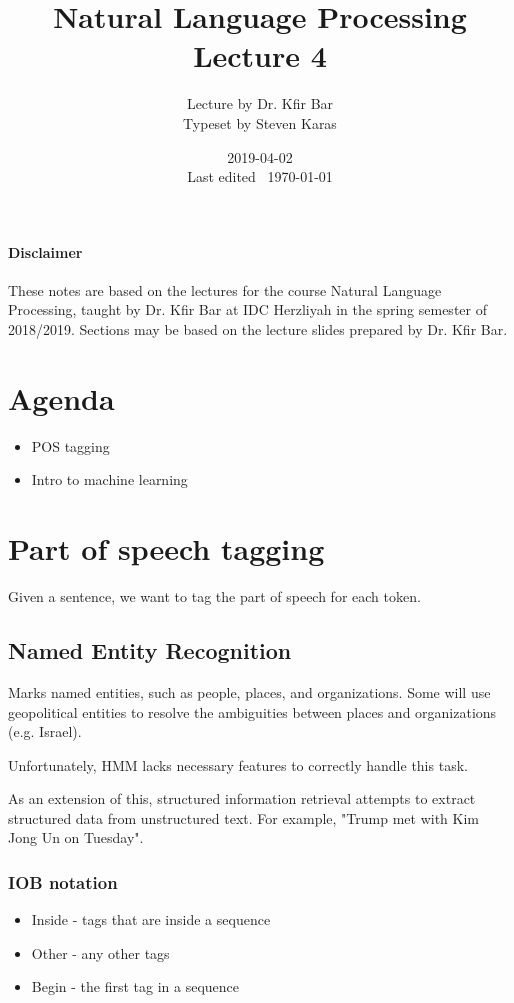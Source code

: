 \documentclass{idc_msc}
\title{Natural Language Processing \\\large Lecture 4}
\date{2019-04-02 \\ Last edited \currenttime\ \today}
\author{Lecture by Dr. Kfir Bar\\Typeset by Steven Karas}
\begin{document}
\paragraph{Disclaimer}

These notes are based on the lectures for the course Natural Language Processing, taught by Dr. Kfir Bar at IDC Herzliyah in the spring semester of 2018/2019.
Sections may be based on the lecture slides prepared by Dr. Kfir Bar.

\nocite{Jurafsky:2009:SLP:0131873210}
\nocite{manning1999foundations}
\nocite{DBLP:journals/corr/Goldberg15c}

\section{Agenda}

\begin{itemize}
  \item POS tagging
  \item Intro to machine learning
\end{itemize}

\section{Part of speech tagging}

Given a sentence, we want to tag the part of speech for each token.

\subsection{Named Entity Recognition}

Marks named entities, such as people, places, and organizations.
Some will use geopolitical entities to resolve the ambiguities between places and organizations (e.g. Israel).

Unfortunately, HMM lacks necessary features to correctly handle this task.

As an extension of this, structured information retrieval attempts to extract structured data from unstructured text.
For example, "Trump met with Kim Jong Un on Tuesday".

\subsubsection{IOB notation}

\begin{itemize}
  \item Inside - tags that are inside a sequence
  \item Other - any other tags
  \item Begin - the first tag in a sequence
\end{itemize}
\end{document}
